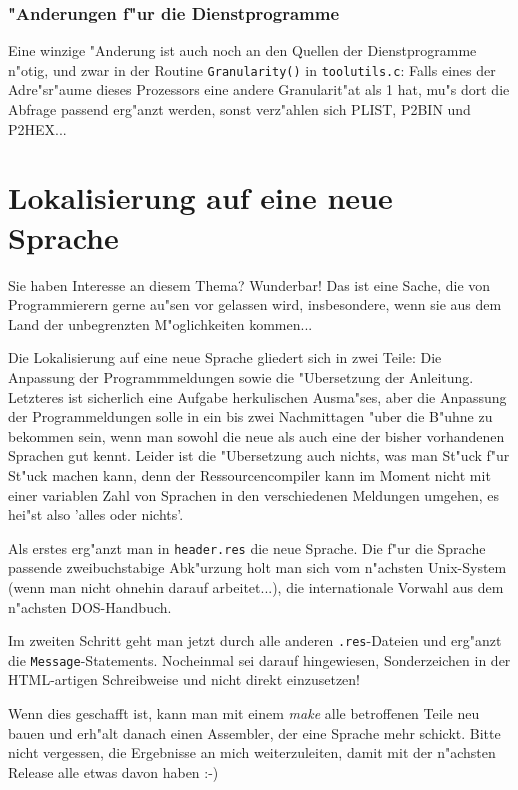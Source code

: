 \documentclass[12pt,a4paper,twoside]{report}
\begin{document}
{\subsubsection{"Anderungen f"ur die Dienstprogramme}

Eine winzige "Anderung ist auch noch an den Quellen der Dienstprogramme
n"otig, und zwar in der Routine {\tt Granularity()} in {\tt toolutils.c}:
Falls eines der Adre"sr"aume dieses Prozessors eine andere Granularit"at 
als 1 hat, mu"s dort die Abfrage passend erg"anzt werden, sonst verz"ahlen
sich PLIST, P2BIN und P2HEX...


\section{Lokalisierung auf eine neue Sprache}

Sie haben Interesse an diesem Thema?  Wunderbar!  Das ist eine Sache, die
von Programmierern gerne au"sen vor gelassen wird, insbesondere, wenn sie
aus dem Land der unbegrenzten M"oglichkeiten kommen...

Die Lokalisierung auf eine neue Sprache gliedert sich in zwei Teile: Die
Anpassung der Programmmeldungen sowie die "Ubersetzung der Anleitung. 
Letzteres ist sicherlich eine Aufgabe herkulischen Ausma"ses, aber die
Anpassung der Programmeldungen solle in ein bis zwei Nachmittagen "uber
die B"uhne zu bekommen sein, wenn man sowohl die neue als auch eine der
bisher vorhandenen Sprachen gut kennt.  Leider ist die "Ubersetzung auch
nichts, was man St"uck f"ur St"uck machen kann, denn der
Ressourcencompiler kann im Moment nicht mit einer variablen Zahl von
Sprachen in den verschiedenen Meldungen umgehen, es hei"st also 'alles
oder nichts'.

Als erstes erg"anzt man in {\tt header.res} die neue Sprache.  Die f"ur
die Sprache passende zweibuchstabige Abk"urzung holt man sich vom
n"achsten Unix-System (wenn man nicht ohnehin darauf arbeitet...), die
internationale Vorwahl aus dem n"achsten DOS-Handbuch.

Im zweiten Schritt geht man jetzt durch alle anderen {\tt .res}-Dateien
und erg"anzt die {\tt Message}-Statements.  Nocheinmal sei darauf
hingewiesen, Sonderzeichen in der HTML-artigen Schreibweise und nicht
direkt einzusetzen!

Wenn dies geschafft ist, kann man mit einem {\em make} alle betroffenen
Teile neu bauen und erh"alt danach einen Assembler, der eine Sprache mehr
schickt.  Bitte nicht vergessen, die Ergebnisse an mich weiterzuleiten,
damit mit der n"achsten Release alle etwas davon haben :-)

}
\end{document}

